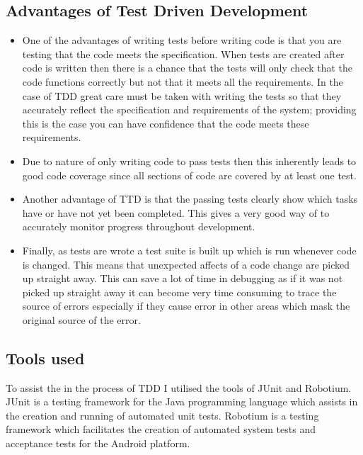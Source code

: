\subsection{Advantages of Test Driven Development}

\begin{itemize}
	\item One of the advantages of writing tests before writing code is that you are testing that  the code meets the specification. When tests are created after code is written then there is a chance that the tests will only check that the code functions correctly but not that it meets all the requirements. In the case of TDD great care must be taken with writing the tests so that they accurately reflect the specification and requirements of the system; providing this is the case you can have confidence that the code meets these requirements.

	\item Due to nature of only writing code to pass tests then this inherently leads to good code coverage since all sections of code are covered by at least one test.

	\item Another advantage of TTD is that the passing tests clearly show which tasks have or have not yet been completed. This gives a very good way of to accurately monitor progress throughout development.

	\item Finally, as tests are wrote a test suite is built up which is run whenever code is changed. This means that unexpected affects of a code change are picked up straight away. This can save a lot of time in debugging as if it was not picked up straight away it can become very time consuming to trace the source of errors especially if they cause error in other areas which mask the original source of the error.
\end{itemize}

\subsection{Tools used}

To assist the in the process of TDD I utilised the tools of JUnit and Robotium. JUnit is a testing framework for the Java programming language which assists in the creation and running of automated unit tests. Robotium is a testing framework which facilitates the creation of automated system tests and acceptance tests for the Android platform.


